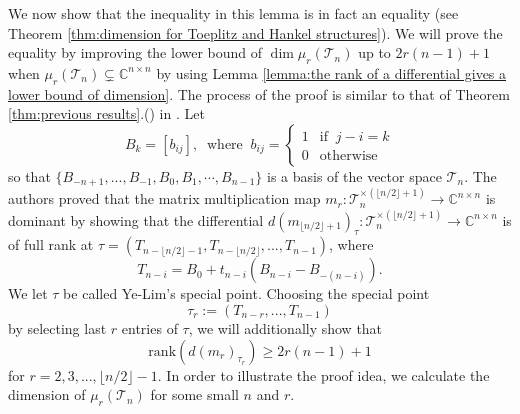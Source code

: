 \documentclass[reqno]{amsart}
\theoremstyle{definition}
\newcommand{\rank}{\mathrm{rank}}
\numberwithin{equation}{section}
\begin{document}
We now show that the inequality in this lemma is in fact an equality (see Theorem \ref{thm:dimension for Toeplitz and Hankel structures}). We will prove the equality by improving the lower bound of $\dim \mu_r(\mathcal{T}_n)$ up to $2r(n-1)+1$ when $\mu_r(\mathcal{T}_n) \subsetneq \mathbb{C}^{n \times n}$ by using Lemma \ref{lemma:the rank of a differential gives a lower bound of dimension}. The process of the proof is similar to that of Theorem \ref{thm:previous results}.() in \cite{ye2016every}. Let
\begin{equation}\label{eq:basis of the space of Toeplitz matrices}
    B_k= [b_{ij}],~\text{ where }~ b_{ij}=\begin{cases}
        1 & \text{if }~j-i=k\\
        0 & \text{otherwise}
    \end{cases}
\end{equation}
so that $\{B_{-n+1},...,B_{-1},B_0,B_1,\cdots,B_{n-1}\}$ is a basis of the vector space $\mathcal{T}_n$. The authors proved that the matrix multiplication map $m_r:\mathcal{T}_n^{\times (\lfloor n/2 \rfloor +1)} \rightarrow \mathbb{C}^{n \times n}$ is dominant  by showing that the differential $d(m_{\lfloor n/2 \rfloor +1})_{\tau}:\mathcal{T}_n^{\times (\lfloor n/2 \rfloor +1)} \rightarrow \mathbb{C}^{n \times n}$ is of full rank at $\tau=(T_{n-\lfloor n/2 \rfloor -1},T_{n-\lfloor n/2 \rfloor },...,T_{n-1})$, where
\begin{equation}\label{eq:special points of pencils of Toeplitz matrices}
    T_{n-i}=B_0+t_{n-i}(B_{n-i}-B_{-(n-i)}).
\end{equation}
We let $\tau$ be called Ye-Lim's special point. Choosing the special point 
\begin{equation}\label{eq:the special point for differential}
    \tau_{r}:=(T_{n-r},...,T_{n-1})
\end{equation}
by selecting last $r$ entries of $\tau$, we will additionally show that
\begin{equation}\label{eq:lower bound of the rank of differential with respect to Toeplitz matrix structure}
    \rank (d(m_r)_{\tau_r}) \geq 2r(n-1)+1 
\end{equation}
for $r=2,3,...,\lfloor n/2 \rfloor-1$. In order to illustrate the proof idea, we calculate the dimension of $\mu_r(\mathcal{T}_n)$ for some small $n$ and $r$.
\end{document}
